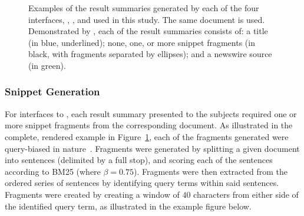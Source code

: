 \begin{figure}[t!]
    \centering
    \caption[Examples of result summaries from the four interfaces]{Examples of the result summaries generated by each of the four interfaces, , ,  and  used in this study. The same document is used. Demonstrated by \searchlogo, each of the result summaries consists of: a title (in blue, underlined); none, one, or more snippet fragments (in black, with fragments separated by ellipses); and a newswire source (in green).}
    \label{fig:interface_snippets}
\end{figure}

\subsubsection{Snippet Generation}\label{sec:snippets:method:snippets}
For interfaces  to , each result summary presented to the subjects required one or more snippet fragments from the corresponding document. As illustrated in the complete, rendered example in Figure~\ref{fig:interface_snippets}, each of the fragments generated were query-biased in nature~\citep{tombros1998query_biased}. Fragments were generated by splitting a given document into sentences (delimited by a full stop), and scoring each of the sentences according to BM25 (where $\beta=0.75$). Fragments were then extracted from the ordered series of sentences by identifying query terms within said sentences. Fragments were created by creating a window of $40$ characters from either side of the identified query term, as illustrated in the example figure below.

\begin{figure}[h]
    \centering
    \vspace{4mm}
    \label{fig:fragment_example}
    \vspace{-5mm}
\end{figure}

